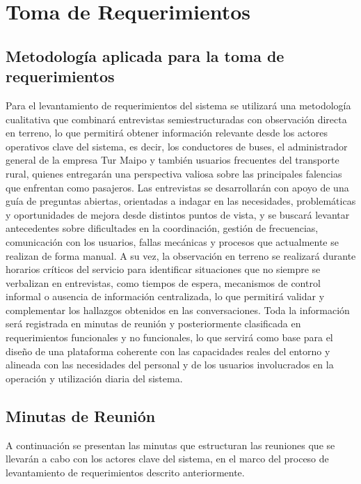 \documentclass[12pt]{article}
\begin{document}
\section{Toma de Requerimientos}
\subsection{Metodología aplicada para la toma de requerimientos}
Para el levantamiento de requerimientos del sistema se utilizará una metodología cualitativa que combinará entrevistas semiestructuradas con observación directa en terreno, lo que permitirá obtener información relevante desde los actores operativos clave del sistema, es decir, los conductores de buses, el administrador general de la empresa Tur Maipo y también usuarios frecuentes del transporte rural, quienes entregarán una perspectiva valiosa sobre las principales falencias que enfrentan como pasajeros. Las entrevistas se desarrollarán con apoyo de una guía de preguntas abiertas, orientadas a indagar en las necesidades, problemáticas y oportunidades de mejora desde distintos puntos de vista, y se buscará levantar antecedentes sobre dificultades en la coordinación, gestión de frecuencias, comunicación con los usuarios, fallas mecánicas y procesos que actualmente se realizan de forma manual. A su vez, la observación en terreno se realizará durante horarios críticos del servicio para identificar situaciones que no siempre se verbalizan en entrevistas, como tiempos de espera, mecanismos de control informal o ausencia de información centralizada, lo que permitirá validar y complementar los hallazgos obtenidos en las conversaciones. Toda la información será registrada en minutas de reunión y posteriormente clasificada en requerimientos funcionales y no funcionales, lo que servirá como base para el diseño de una plataforma coherente con las capacidades reales del entorno y alineada con las necesidades del personal y de los usuarios involucrados en la operación y utilización diaria del sistema.

\newpage
\subsection{Minutas de Reunión}
A continuación se presentan las minutas que estructuran las reuniones que se llevarán a cabo con los actores clave del sistema, en el marco del proceso de levantamiento de requerimientos descrito anteriormente.
\end{document}

